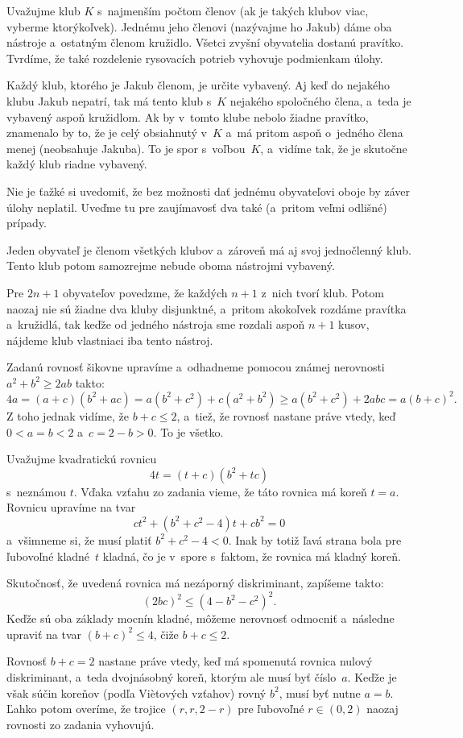 {%
Uvažujme klub $K$ s~najmenším počtom členov (ak je takých klubov
viac, vyberme ktorýkoľvek). Jednému jeho členovi (nazývajme ho Jakub) dáme
oba nástroje a~ostatným členom kružidlo. Všetci zvyšní obyvatelia dostanú
pravítko. Tvrdíme, že také rozdelenie rysovacích potrieb vyhovuje
podmienkam úlohy.

Každý klub, ktorého je Jakub členom, je určite vybavený. Aj keď do
nejakého klubu Jakub nepatrí, tak má tento klub s~$K$ nejakého
spoločného člena, a~teda je vybavený aspoň kružidlom. Ak by v~tomto
klube nebolo žiadne pravítko, znamenalo by to, že je celý obsiahnutý v~$K$
a~má pritom aspoň o~jedného člena menej (neobsahuje Jakuba). To je
spor s~voľbou~$K$, a~vidíme tak, že je skutočne každý klub riadne
vybavený.

\poznamka
Nie je ťažké si uvedomiť, že bez možnosti dať
jednému obyvateľovi oboje by záver úlohy neplatil. Uveďme tu pre
zaujímavosť dva také (a~pritom veľmi odlišné) prípady.

Jeden obyvateľ je členom všetkých klubov a~zároveň má aj svoj
jednočlenný klub. Tento klub potom samozrejme nebude oboma nástrojmi vybavený.

Pre $2n+1$ obyvateľov povedzme, že každých $n+1$ z~nich tvorí klub.
Potom naozaj nie sú žiadne dva kluby disjunktné, a~pritom akokoľvek
rozdáme pravítka a~kružidlá, tak keďže od jedného nástroja sme
rozdali aspoň $n+1$ kusov, nájdeme klub vlastniaci iba tento
nástroj.
}

{%
Zadanú rovnosť šikovne upravíme a~odhadneme pomocou
známej nerovnosti ${a^2+b^2 }\ge 2ab$ takto:
$$
4a = (a+c)(b^2+ac)
= a(b^2+c^2) + c(a^2+b^2) \geq a(b^2+c^2) + 2abc
= a(b+c)^2.
$$
Z toho jednak vidíme, že $b + c \le 2$, a~tiež, že rovnosť nastane
práve vtedy, keď ${0 < a=b < 2}$ a~$c = 2-b > 0$. To je všetko.

\ineriesenie
Uvažujme kvadratickú rovnicu
$$
4t = (t+c)(b^2+tc)
$$
s~neznámou $t$. Vďaka vzťahu zo zadania vieme, že táto rovnica má koreň $t = a$.
Rovnicu upravíme na tvar
$$
ct^2+ (b^2+c^2-4)t + cb^2 = 0
$$
a~všimneme si, že musí platiť $b^2+c^2-4 <0$. Inak by totiž
ľavá strana bola pre ľubovoľné kladné~$t$ kladná, čo je v~spore s~faktom, že
rovnica má kladný koreň.

Skutočnosť, že uvedená rovnica má nezáporný diskriminant, zapíšeme takto:
$$
(2bc)^2 \le (4-b^2-c^2)^2.
$$
Keďže sú oba základy mocnín kladné, môžeme nerovnosť odmocniť
a~následne upraviť na tvar $(b+c)^2 \le 4$, čiže $b+c \le 2$.

Rovnosť $b+c = 2$ nastane práve vtedy, keď má spomenutá rovnica nulový
diskriminant, a~teda dvojnásobný koreň, ktorým ale musí byť číslo~$a$. Keďže je
však súčin koreňov (podľa Vi\`etových vzťahov) rovný $b^2$, musí byť nutne
$a=b$. Ľahko potom overíme, že trojice $(r,r,2-r)$ pre ľubovoľné $r \in (0,2)$
naozaj rovnosti zo zadania vyhovujú.
}

